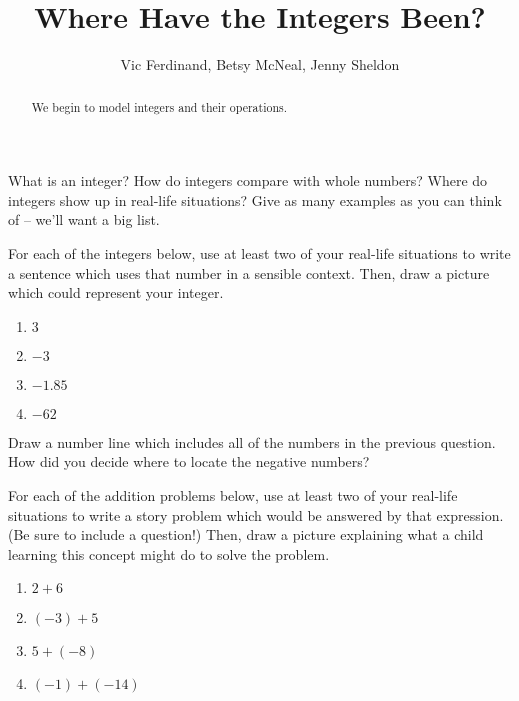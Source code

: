 \documentclass{ximera}
\title{Where Have the Integers Been?}
\author{Vic Ferdinand, Betsy McNeal, Jenny Sheldon}
\begin{document}
\begin{abstract}
    We begin to model integers and their operations.
\end{abstract}
\maketitle



\begin{problem}
What is an integer?  How do integers compare with whole numbers?  Where do integers show up in real-life situations?  Give as many examples as you can think of -- we'll want a big list.
\end{problem}

\begin{problem}
For each of the integers below, use at least two of your real-life situations to write a sentence which uses that number in a sensible context.  Then, draw a picture which could represent your integer.
\begin{enumerate}
    \item $3$
    \item $-3$
    \item $-1.85$
    \item $-62$
\end{enumerate}

\end{problem}

\begin{problem}
Draw a number line which includes all of the numbers in the previous question.  How did you decide where to locate the negative numbers?
\end{problem}

\begin{problem}
For each of the addition problems below, use at least two of your real-life situations to write a story problem which would be answered by that expression.  (Be sure to include a question!)  Then, draw a picture explaining what a child learning this concept might do to solve the problem.
\begin{enumerate}
    \item $2+6$
    \item $(-3) + 5$
    \item $5 + (-8)$
    \item $(-1) + (-14)$
\end{enumerate}

\end{problem}
\end{document}
